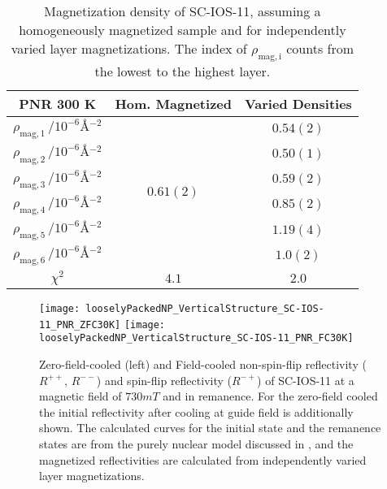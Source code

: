 \documentclass[\main/dresen_thesis.tex]{subfiles}
\begin{document}
  \begin{table}[!htbp]
    \centering
    \caption{\label{tab:looselyPackedNP:layers:pnrSCIOS300K500mT}Magnetization density of SC-IOS-11, assuming a homogeneously magnetized sample and for independently varied layer magnetizations. The index of $\rho_\mathrm{mag, i}$ counts from the lowest to the highest layer.}
    \begin{tabular}{ c | c | c}
      \rule{0pt}{2ex} \textbf{PNR \@ 300 K}  & Hom. Magnetized & Varied Densities \\
      \hline
      $\rho_\mathrm{mag, 1} \, / \unit{10^{-6} \angstrom^{-2}} $    & \multirow{6}{*}{$0.61(2)$} & $0.54(2)$\\
      $\rho_\mathrm{mag, 2} \, / \unit{10^{-6} \angstrom^{-2}} $    &                            & $0.50(1)$\\
      $\rho_\mathrm{mag, 3} \, / \unit{10^{-6} \angstrom^{-2}} $    &                            & $0.59(2)$\\
      $\rho_\mathrm{mag, 4} \, / \unit{10^{-6} \angstrom^{-2}} $    &                            & $0.85(2)$\\
      $\rho_\mathrm{mag, 5} \, / \unit{10^{-6} \angstrom^{-2}} $    &                            & $1.19(4)$\\
      $\rho_\mathrm{mag, 6} \, / \unit{10^{-6} \angstrom^{-2}} $    &                            & $1.0(2)$\\
      \hline
      $\chi^2$                                                      & $4.1$     & $2.0$\\
      \hline
    \end{tabular}
  \end{table}


  \begin{figure}[tb]
    \centering
    \texttt{[image: looselyPackedNP\_VerticalStructure\_SC-IOS-11\_PNR\_ZFC30K]}
    \texttt{[image: looselyPackedNP\_VerticalStructure\_SC-IOS-11\_PNR\_FC30K]}
    \caption{\label{fig:looselyPackedNP:layer:pnrZFCFCIOS11}Zero-field-cooled (left) and Field-cooled non-spin-flip reflectivity ($R^{++},\,R^{--}$) and spin-flip reflectivity ($R^{-+}$) of SC-IOS-11 at a magnetic field of $730 \unit{mT}$ and in remanence. For the zero-field cooled the initial reflectivity after cooling at guide field is additionally shown. The calculated curves for the initial state and the remanence states are from the purely nuclear model discussed in , and the magnetized reflectivities are calculated from independently varied layer magnetizations.}
  \end{figure}
\end{document}
